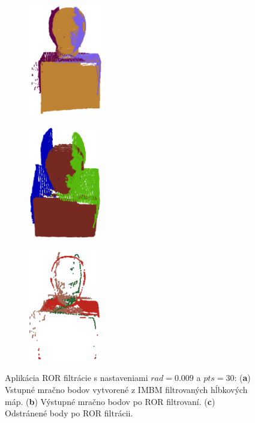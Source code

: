 \begin{figure}[h]
	\centering
	\begin{subfigure}[b]{0.32\textwidth}
		\centering
		\includegraphics[height=4.9cm]{figures/model_colors.png}
		\caption{}
		\label{fig:ror:a}
	\end{subfigure}
	\hfill
	\begin{subfigure}[b]{0.32\textwidth}
		\centering
		\includegraphics[height=4.9cm]{figures/ror_preserv.png}
		\caption{}
		\label{fig:ror:b}
	\end{subfigure}
	\hfill
	\begin{subfigure}[b]{0.32\textwidth}
		\centering
		\includegraphics[height=4.9cm]{figures/ror_rem.png}
		\caption{}
		\label{fig:ror:c}
	\end{subfigure}
	\caption{Aplikácia ROR filtrácie s nastaveniami $rad=0.009$ a  $pts=30$: (\textbf{a}) Vstupné mračno bodov vytvorené z IMBM filtrovaných hĺbkových máp. (\textbf{b}) Výstupné mračno bodov po ROR filtrovaní. (\textbf{c}) Odstránené body po ROR filtrácii.}
	\label{fig:ror}
\end{figure}

